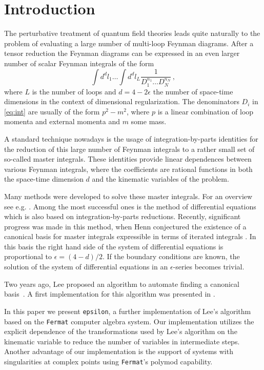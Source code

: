 \documentclass[12pt]{article}
\numberwithin{equation}{section}
\numberwithin{figure}{section}
\begin{document}
  \section{Introduction}
    The perturbative treatment of quantum field theories leads quite naturally to the problem of evaluating a large number of multi-loop Feynman diagrams.
    After a tensor reduction the Feynman diagrams can be expressed in an even larger number of scalar Feynman integrals of the form
    \begin{equation} \label{eq:int}
      \int d^dl_1 \dots \int d^dl_L \frac1{D_1^{n_1} \dots D_N^{n_N}}\,,
    \end{equation}
    where $L$ is the number of loops and $d=4-2\epsilon$ the number of space-time dimensions in the context of dimensional regularization.
    The denominators $D_i$ in \eqref{eq:int} are usually of the form $p^2 - m^2$, where $p$ is a linear combination of loop momenta and external momenta and $m$ some mass.

    A standard technique nowadays is the usage of integration-by-parts identities \cite{Tkachov:1981wb,Chetyrkin:1981qh} for the reduction of this large number of Feynman integrals to a rather small set of so-called master integrals.
    These identities provide linear dependences between various Feynman integrals, where the coefficients are rational functions in both the space-time dimension $d$ and the kinematic variables of the problem.

    Many methods were developed to solve these master integrals.
    For an overview see e.g. \cite{Smirnov:2012gma}.
    Among the most successful ones is the method of differential equations which is also based on integration-by-parts reductions\cite{Kotikov:1990kg,Kotikov:1991hm,Kotikov:1991pm}.
    Recently, significant progress was made in this method, when Henn conjectured the existence of a canonical basis for master integrals expressible in terms of iterated integrals \cite{Henn:2013pwa}.
    In this basis the right hand side of the system of differential equations is proportional to $\epsilon = (4-d)/2$.
    If the boundary conditions are known, the solution of the system of differential equations in an $\epsilon$-series becomes trivial.

    Two years ago, Lee proposed an algorithm to automate finding a canonical basis~\cite{Lee:2014ioa}.
    A first implementation for this algorithm was presented in \cite{Gituliar:2016vfa,Gituliar:2017vzm}.

    In this paper we present \texttt{epsilon}, a further implementation of Lee's algorithm based on the \texttt{Fermat}\cite{Lewis:fermat} computer algebra system.
    Our implementation utilizes the explicit dependence of the transformations used by Lee's algorithm on the kinematic variable to reduce the number of variables in intermediate steps.
    Another advantage of our implementation is the support of systems with singularities at complex points using \texttt{Fermat}'s polymod capability.
\end{document}
